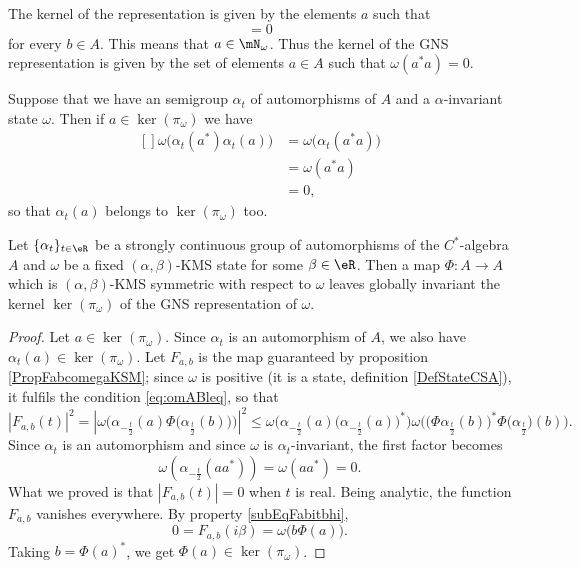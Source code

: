 The kernel of the representation is given by the elements $a$ such that
\begin{equation}
	[ab]=0
\end{equation}
for every $b\in A$. This means that $a\in\mN_{\omega}$. Thus the kernel of the GNS representation is given by the set of elements $a\in A$ such that $\omega(a^*a)=0$.

Suppose that we have an semigroup $\alpha_t$ of automorphisms of $A$ and a $\alpha$-invariant state $\omega$. Then if $a\in\ker(\pi_{\omega})$ we have
\begin{equation}
	\begin{aligned}[]
		\omega\big( \alpha_t(a^*)\alpha_t(a) \big)&=\omega\big( \alpha_t(a^*a) \big)\\
		&=\omega(a^*a)\\
		&=0,
	\end{aligned}
\end{equation}
so that $\alpha_t(a)$ belongs to $\ker(\pi_{\omega})$ too.

\begin{proposition}
	Let $\{ \alpha_t \}_{t\in\eR}$ be a strongly continuous group of automorphisms of the $C^*$-algebra $A$ and $\omega$ be a fixed $(\alpha,\beta)$-KMS state for some $\beta\in\eR$. Then a map $\Phi\colon A\to A$ which is $(\alpha,\beta)$-KMS symmetric with respect to $\omega$ leaves globally invariant the kernel $\ker(\pi_{\omega})$ of the GNS representation of $\omega$.
\end{proposition}

\begin{proof}
	Let $a\in\ker(\pi_{\omega})$. Since $\alpha_t$ is an automorphism of $A$, we also have $\alpha_t(a)\in\ker(\pi_{\omega})$. Let $F_{a,b}$ is the map guaranteed by proposition \ref{PropFabcomegaKSM}; since $\omega$ is positive (it is a state, definition \ref{DefStateCSA}), it fulfils the condition \eqref{eq:omABleq}, so that
	\begin{equation}
		| F_{a,b}(t) |^2=|\omega\Big( \alpha_{-\frac{ t }{2}}(a)\Phi\big( \alpha_{\frac{ t }{ 2 }}(b) \big) \Big)|^2\leq \omega\Big( \alpha_{-\frac{ t }{2}}(a)\big( \alpha_{-\frac{ t }{2}}(a) \big)^* \Big)\omega\Big(  \big(\Phi \alpha_{\frac{ t }{2}}(b) \big)^*\Phi\big( \alpha_{\frac{ t }{2}} \big)(b) \Big).
	\end{equation}
	Since $\alpha_t$ is an automorphism and since $\omega$ is $\alpha_t$-invariant, the first factor becomes
	\begin{equation}
		\omega(\alpha_{-\frac{ t }{2}}(aa^*))=\omega(aa^*)=0.
	\end{equation}
	What we proved is that $| F_{a,b}(t) |=0$ when $t$ is real. Being analytic, the function $F_{a,b}$ vanishes everywhere. By property \eqref{subEqFabitbhi},
	\begin{equation}
		0=F_{a,b}(i\beta)=\omega\big( b\Phi(a) \big).
	\end{equation}
	Taking $b=\Phi(a)^*$, we get $\Phi(a)\in\ker(\pi_{\omega})$.
\end{proof}

